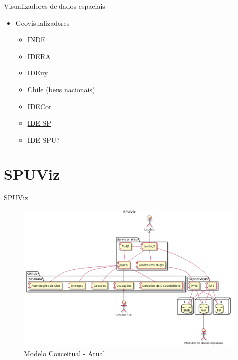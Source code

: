 \documentclass[9pt,ignorenonframetext,]{beamer}
\providecommand{\tightlist}{%
  \setlength{\itemsep}{0pt}\setlength{\parskip}{0pt}}
\begin{document}
\begin{frame}[t]{Visualizadores de dados espaciais}
\protect\hypertarget{visualizadores-de-dados-espaciais}{}

\begin{itemize}[<+->]
\tightlist
\item
  Geovisualizadores

  \begin{itemize}[<+->]
  \tightlist
  \item
    \href{https://visualizador.inde.gov.br/}{INDE}
  \item
    \href{https://mapa.idera.gob.ar/}{IDERA}
  \item
    \href{https://www.gub.uy/infraestructura-datos-espaciales/publico/visualizador}{IDEuy}
  \item
    \href{http://www.catastro.cl/}{Chile (bens nacionais)}
  \item
    \href{https://idecor.cba.gov.ar/}{IDECor}
  \item
    \href{http://www.idesp.sp.gov.br/Visualizador}{IDE-SP}
  \item
    IDE-SPU?
  \end{itemize}
\end{itemize}

\end{frame}

\hypertarget{spuviz}{%
\section{SPUViz}\label{spuviz}}

\begin{frame}{SPUViz}
\protect\hypertarget{spuviz-1}{}

\begin{figure}[H]

{\centering \includegraphics[width=0.8\linewidth]{images/modeloConceitual} 

}

\caption{Modelo Conceitual - Atual}\label{fig:unnamed-chunk-12}
\end{figure}

\end{frame}
\end{document}
